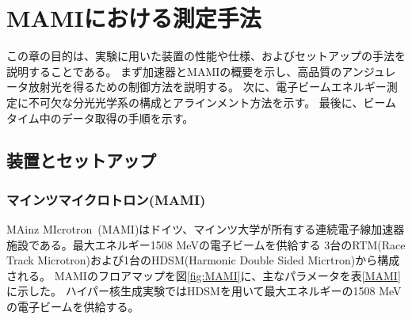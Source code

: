 \documentclass[a4paper,11pt,uplatex]{jsbook}
\begin{document}
\chapter{MAMIにおける測定手法}
この章の目的は、実験に用いた装置の性能や仕様、およびセットアップの手法を説明することである。
まず加速器とMAMIの概要を示し、高品質のアンジュレータ放射光を得るための制御方法を説明する。
次に、電子ビームエネルギー測定に不可欠な分光光学系の構成とアラインメント方法を示す。
最後に、ビームタイム中のデータ取得の手順を示す。
\section{装置とセットアップ}
\subsection{マインツマイクロトロン(MAMI)}\label{sec:MAMI}
MAinz MIcrotron~(MAMI)はドイツ、マインツ大学が所有する連続電子線加速器施設である。最大エネルギー1508 MeVの電子ビームを供給する
3台のRTM(Race Track Microtron)および1台のHDSM(Harmonic Double Sided Micrtron)から構成される。
MAMIのフロアマップを図\ref{fig:MAMI}に、主なパラメータを表\ref{MAMI}に示した。
ハイパー核生成実験ではHDSMを用いて最大エネルギーの1508 MeVの電子ビームを供給する。
\end{document}
